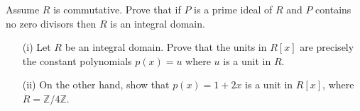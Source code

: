 \documentclass[12pt,letterpaper]{hmcpset}
\newcommand{\Zz}{\mathbb{Z}}
\begin{document}
\begin{problem}[7.4.10]
	Assume $R$ is commutative. Prove that if $P$ is a prime ideal of $R$ and $P$ contains no zero divisors then $R$ is an integral domain.
\end{problem}
\begin{solution}
	\vfill
\end{solution}
\newpage

\begin{problem}[{\bf Problem A}]
	\begin{enumerate}
		\item[(i)]
		Let $R$ be an integral domain. Prove that the units in $R[x]$ are precisely the constant polynomials $p(x) = u$ where $u$ is a unit in $R$.
		\item[(ii)]
		On the other hand, show that $p(x) = 1+2x$ is a unit in $R[x]$, where $R = \Zz/4\Zz$.
	\end{enumerate}
\end{problem}
\begin{solution}
	\vfill
\end{solution}
\end{document}
